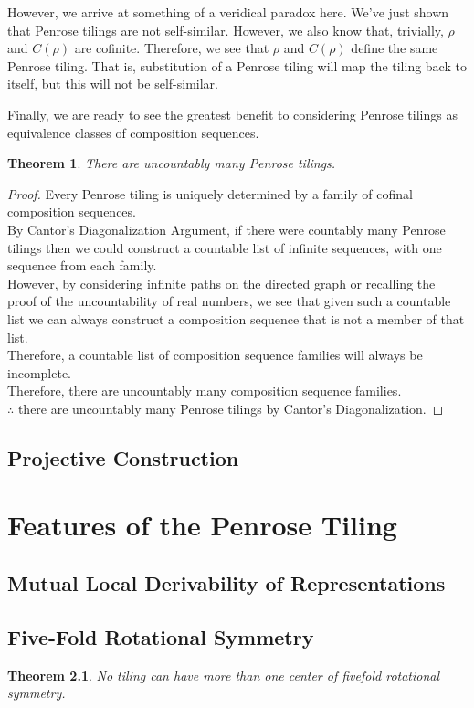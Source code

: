 \documentclass[
  oneside,
  11pt, a4paper,
  footinclude=true,
  headinclude=true,
  cleardoublepage=empty
]{scrbook}
\newtheorem{mythm}{Theorem}
\begin{document}
However, we arrive at something of a veridical paradox here. We've just shown that Penrose tilings are not self-similar. However, we also know that, trivially, $\rho$ and $C(\rho)$ are cofinite. Therefore, we see that $\rho$ and $C(\rho)$ define the same Penrose tiling. That is, substitution of a Penrose tiling will map the tiling back to itself, but this will not be self-similar. 

Finally, we are ready to see the greatest benefit to considering Penrose tilings as equivalence classes of composition sequences.

\begin{mythm}
There are uncountably many Penrose tilings.
\end{mythm}

\begin{proof}
Every Penrose tiling is uniquely determined by a family of cofinal composition sequences.\\
By Cantor's Diagonalization Argument, if there were countably many Penrose tilings then we could construct a countable list of infinite sequences, with one sequence from each family.\\
However, by considering infinite paths on the directed graph or recalling the proof of the uncountability of real numbers, we see that given such a countable list we can always construct a composition sequence that is not a member of that list.\\
Therefore, a countable list of composition sequence families will always be incomplete.\\
Therefore, there are uncountably many composition sequence families.\\
$\therefore$ there are uncountably many Penrose tilings by Cantor's Diagonalization.
\end{proof}

\section{Projective Construction}


\chapter{Features of the Penrose Tiling}
\section{Mutual Local Derivability of Representations}
\section{Five-Fold Rotational Symmetry}
\begin{mythm}
No tiling can have more than one center of fivefold rotational symmetry.
\label{symthm}
\end{mythm}
\end{document}
